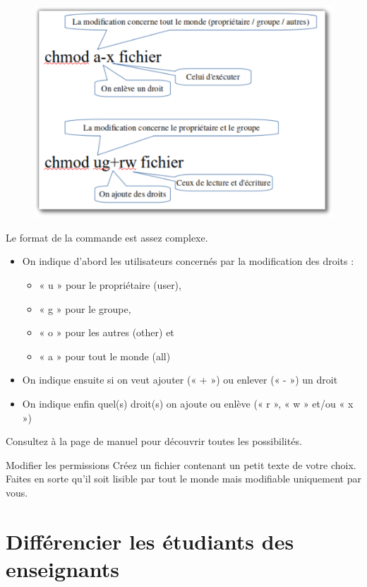 \documentclass[a4paper,11pt]{style-esi/td}
\begin{document}
			\begin{figure}
				\vspace{-1em}
				\includegraphics[width=.4\textwidth]{image/chmod.pdf}
				\vspace{-2em}
			\end{figure}
			Le format de la commande est assez complexe. 
			\begin{itemize}
			\item
				On indique d'abord les utilisateurs concernés par la modification des droits :
				\begin{itemize}
				\item « u » pour le propriétaire (user), 
				\item « g » pour le groupe, 
				\item « o » pour les autres (other) et
				\item « a » pour tout le monde (all)
				\end{itemize}  
			\item
				On indique ensuite si on veut ajouter (« + ») 
				ou enlever (« - ») un droit
			\item 
				On indique enfin quel(s) droit(s) on ajoute ou enlève 
				(« r », « w » et/ou « x »)
			\end{itemize}

			Consultez à la page de manuel pour découvrir toutes les possibilités.

			\begin{Exercice}{Modifier les permissions}
				Créez un fichier  
				contenant un petit texte de votre choix.
				Faites en sorte qu'il soit lisible par tout le monde
				mais modifiable uniquement par vous.
			\end{Exercice}

	\section{Différencier les étudiants des enseignants}
\end{document}
